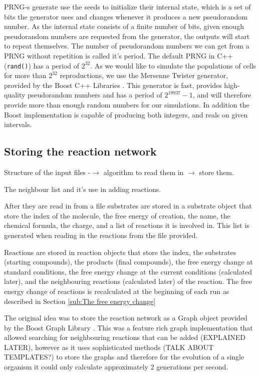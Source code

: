 \documentclass[10pt,a4paper]{article}
\begin{document}
PRNG-s generate use the seeds to initialize their internal state, which is a set of bits the generator uses and changes whenever it produces a new pseudorandom number. As the internal state consists of a finite number of bits, given enough pseudorandom numbers are requested from the generator, the outputs will start to repeat themselves. The number of pseudorandom numbers we can get from a PRNG without repetition is called it's period. The default PRNG in C++ (\texttt{rand()}) has a period of $2^{32}$. As we would like to simulate the populations of cells for more than $2^{32}$ reproductions, we use the Mersenne Twister \cite{mersennetwister} generator, provided by the Boost C++ Libraries \cite{boostlibraries}. This generator is fast, provides high-quality pseudorandom numbers and has a period of $2^{19937}-1$, and will therefore provide more than enough random numbers for our simulations. In addition the Boost implementation is capable of producing both integers, and reals on given intervals. 


\subsection{Storing the reaction network}
\label{sub:Storing the reaction network}
Structure of the input files -$\rightarrow$ algorithm to read them in $\rightarrow$ store them. 

The neighbour list and it's use in adding reactions.



	After they are read in from a file substrates are stored in a substrate object that store the index of the molecule, the free energy of creation, the name, the chemical formula, the charge, and a list of reactions it is involved in. This list is generated when reading in the reactions from the file provided.
	
	Reactions are stored in reaction objects that store the index, the substrates  (starting compounds), the products  (final compounds), the free energy change at standard conditions, the free energy change at the current conditions (calculated later), and the neighbouring reactions (calculated later) of the reaction. The free energy change of reactions is recalculated at the beginning of each run as described in Section \ref{sub:The free energy change}
	
	The original idea was to store the reaction network as a Graph object provided by the Boost Graph Library \cite{boostlibraries}. This was a feature rich graph implementation that allowed searching for neighbouring reactions that can be added (EXPLAINED LATER), however as it uses sophisticated methods (TALK ABOUT TEMPLATES?) to store the  graphs and therefore for the evolution of a single organism it could only calculate approximately 2 generations per second. 
	
\end{document}
